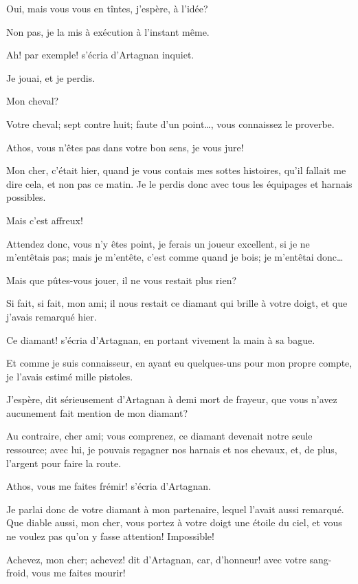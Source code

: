 \speak  Oui, mais vous vous en tîntes, j'espère, à l'idée? 

\speak  Non pas, je la mis à exécution à l'instant même. 

\speak  Ah! par exemple! s'écria d'Artagnan inquiet. 

\speak  Je jouai, et je perdis. 

\speak  Mon cheval? 

\speak  Votre cheval; sept contre huit; faute d'un point\dots, vous connaissez le proverbe. 

\speak  Athos, vous n'êtes pas dans votre bon sens, je vous jure! 

\speak  Mon cher, c'était hier, quand je vous contais mes sottes histoires, qu'il fallait me dire cela, et non pas ce matin. Je le perdis donc avec tous les équipages et harnais possibles. 

\speak  Mais c'est affreux! 

\speak  Attendez donc, vous n'y êtes point, je ferais un joueur excellent, si je ne m'entêtais pas; mais je m'entête, c'est comme quand je bois; je m'entêtai donc\dots 

\speak  Mais que pûtes-vous jouer, il ne vous restait plus rien? 

\speak  Si fait, si fait, mon ami; il nous restait ce diamant qui brille à votre doigt, et que j'avais remarqué hier. 

\speak  Ce diamant! s'écria d'Artagnan, en portant vivement la main à sa bague. 

\speak  Et comme je suis connaisseur, en ayant eu quelques-uns pour mon propre compte, je l'avais estimé mille pistoles. 

\speak  J'espère, dit sérieusement d'Artagnan à demi mort de frayeur, que vous n'avez aucunement fait mention de mon diamant? 

\speak  Au contraire, cher ami; vous comprenez, ce diamant devenait notre seule ressource; avec lui, je pouvais regagner nos harnais et nos chevaux, et, de plus, l'argent pour faire la route. 

\speak  Athos, vous me faites frémir! s'écria d'Artagnan. 

\speak  Je parlai donc de votre diamant à mon partenaire, lequel l'avait aussi remarqué. Que diable aussi, mon cher, vous portez à votre doigt une étoile du ciel, et vous ne voulez pas qu'on y fasse attention! Impossible! 

\speak  Achevez, mon cher; achevez! dit d'Artagnan, car, d'honneur! avec votre sang-froid, vous me faites mourir! 

